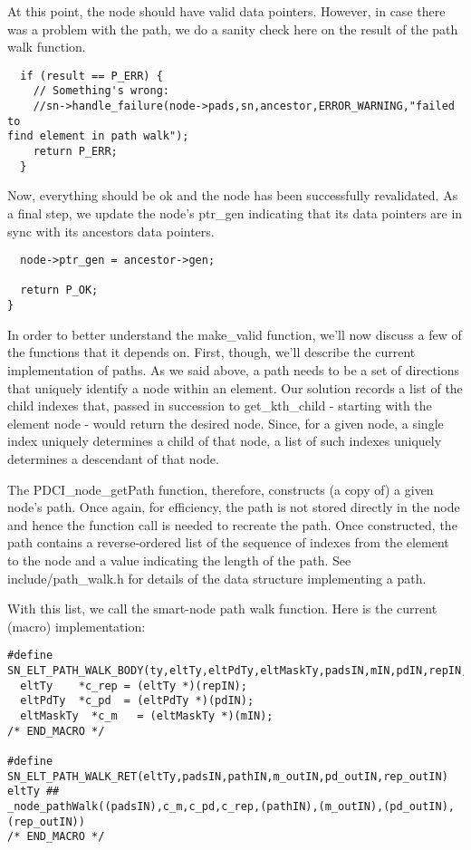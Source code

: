 \documentclass{article}
\begin{document}
At this point, the node should have valid data pointers. However, in 
case there was a problem with the path, we do a sanity check here on the 
result of the path walk function.

\begin{verbatim}
  if (result == P_ERR) {
    // Something's wrong:
    //sn->handle_failure(node->pads,sn,ancestor,ERROR_WARNING,"failed to 
find element in path walk");
    return P_ERR;
  }
\end{verbatim}

Now, everything should be ok and the node has been successfully 
revalidated. As a final step, we update the node's ptr_gen indicating 
that its data pointers are in sync with its ancestors data pointers.

\begin{verbatim}
  node->ptr_gen = ancestor->gen;

  return P_OK;
}
\end{verbatim}

  In order to better understand the make_valid function, we'll now 
discuss a few of the functions that it depends on. First, though, we'll 
describe the current implementation of paths. As we said above, a path 
needs to be a set of directions that uniquely identify a node within an 
element. Our solution records a list of the child indexes that, passed 
in succession to get_kth_child - starting with the element node - would 
return the desired node. Since, for a given node, a single index 
uniquely determines a child of that node, a list of such indexes 
uniquely determines a descendant of that node.

  The PDCI_node_getPath function, therefore, constructs (a copy of) a 
given node's path. Once again, for efficiency, the path is not stored 
directly in the node and hence the function call is needed to recreate 
the path. Once constructed, the path contains a reverse-ordered list of 
the sequence of indexes from the element to the node and a value 
indicating the length of the path. See include/path_walk.h for details 
of the data structure implementing a path.

  With this list, we call the smart-node path walk function. Here is the 
current (macro) implementation:

\begin{verbatim}
#define 
SN_ELT_PATH_WALK_BODY(ty,eltTy,eltPdTy,eltMaskTy,padsIN,mIN,pdIN,repIN,pathIN,m_outIN,pd_outIN,rep_outIN)
  eltTy    *c_rep = (eltTy *)(repIN);
  eltPdTy  *c_pd  = (eltPdTy *)(pdIN);
  eltMaskTy  *c_m   = (eltMaskTy *)(mIN);
/* END_MACRO */

#define SN_ELT_PATH_WALK_RET(eltTy,padsIN,pathIN,m_outIN,pd_outIN,rep_outIN)
eltTy ## 
_node_pathWalk((padsIN),c_m,c_pd,c_rep,(pathIN),(m_outIN),(pd_outIN),(rep_outIN))
/* END_MACRO */
\end{verbatim}
\end{document}
